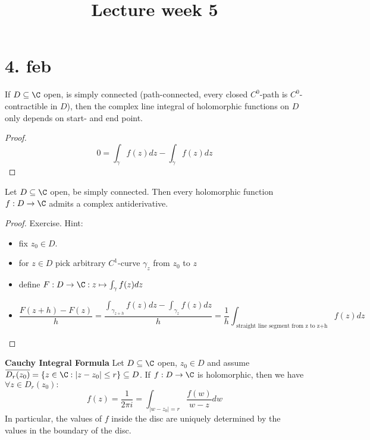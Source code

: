 \title{Lecture week 5}
\maketitle
\section{4. feb}
\begin{corollary}
  If $D\subseteq \C$ open, is simply connected (path-connected, every closed $C^0$-path is $C^0$-contractible in $D$), then the complex line integral of holomorphic functions on $D$ only depends on start- and end point.
\end{corollary}
\begin{proof}
  $$0=\int_{\gamma}f(z)dz-\int_{\tilde{\gamma}}f(z)dz$$
\end{proof}

\begin{proposition}
  Let $D\subseteq \C$ open, be simply connected. Then every holomorphic function $f:D\to \C$ admits a complex antiderivative.
\end{proposition}
\begin{proof}
  Exercise.
  Hint:
\begin{itemize}
  \item fix $z_0\in D$.
  \item for $z\in D$ pick arbitrary $C^1$-curve $\gamma_z$ from $z_0$ to $z$
  \item define $F:D\to \C: z\mapsto \int_{\gamma}f(z)dz$
  \item
    $$\frac{F(z+h)-F(z)}{h}=\frac{\int_{\gamma_{z+h}}f(z)dz-\int_{\gamma_z}f(z)dz}{h}=\frac{1}{h}\int_{\text{ straight line segment from z to z+h}}f(z)dz$$
\end{itemize}

\end{proof}

\begin{theorem}\label{CauchyIntForm}
  \textbf{Cauchy Integral Formula}
  \newline Let $D\subseteq \C$ open, $z_0\in D$ and assume $\overline{D_r(z_0)}=\{z\in \C:|z-z_0|\leq r\}\subseteq D$. If $f:D\to \C$ is holomorphic, then we have $\forall z\in D_r(z_0):$
    $$f(z)=\frac{1}{2\pi i}=\int_{|w-z_0|=r}\frac{f(w)}{w-z}dw$$
    In particular, the values of $f$ inside the disc are uniquely determined by the values in the boundary of the disc.
\end{theorem}

